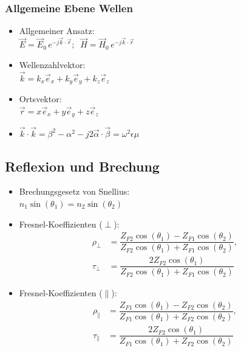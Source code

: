 {	 \subsubsection{Allgemeine Ebene Wellen}
	 \begin{itemize}
	 	\itemsep0pt
		\item Allgemeiner Ansatz:\\
		\(\vec{E} = \vec{E}_0\,e^{-j\vec{k}\cdot\vec{r}};\;\;\vec{H} = \vec{H}_0\,e^{-j\vec{k}\cdot\vec{r}}\)
		\item Wellenzahlvektor:\\
		\(\vec{k} = k_x\vec{e}_x + k_y\vec{e}_y + k_z\vec{e}_z\)
		\item Ortsvektor:\\
		\(\vec{r} = x\vec{e}_x + y\vec{e}_y + z\vec{e}_z\)
		\item \(\vec{k}\cdot\vec{k} = \beta^2 - \alpha^2 - j2\vec{\alpha}\cdot\vec{\beta} = \omega^2\epsilon\mu\)
	 \end{itemize}

 \subsection{Reflexion und Brechung}
 \begin{itemize}
     \itemsep0pt
     \item Brechungsgesetz von Snellius:\\
         \(n_1 \sin(\theta_1) = n_2 \sin(\theta_2)\)
     \item Fresnel-Koeffizienten ($\perp$):\\
         \begin{align*}
             \rho_\perp &= \dfrac{Z_{F2} \cos(\theta_1) - Z_{F1}\cos(\theta_2)}{Z_{F2}\cos(\theta_1) + Z_{F1} \cos(\theta_2)},\\
             \tau_\perp &= \dfrac{2Z_{F2} \cos(\theta_1)}{Z_{F2}\cos(\theta_1) + Z_{F1} \cos(\theta_2)}
         \end{align*}
     \item Fresnel-Koeffizienten ($\parallel$):\\
         \begin{align*}
             \rho_\parallel &= \dfrac{Z_{F1} \cos(\theta_1) - Z_{F2}\cos(\theta_2)}{Z_{F1}\cos(\theta_1) + Z_{F2} \cos(\theta_2)},\\
             \tau_\parallel &= \dfrac{2Z_{F2} \cos(\theta_1)}{Z_{F1}\cos(\theta_1) + Z_{F2} \cos(\theta_2)}
         \end{align*}


\end{itemize}}
